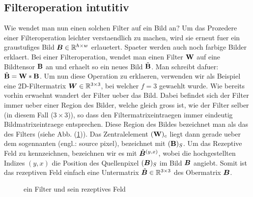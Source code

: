 \subsection{Filteroperation intutitiv}\label{sec:filteroperation_intuitiv}
Wie wendet man nun einen solchen Filter auf ein Bild an? Um das Prozedere einer
Filteroperation leichter verstaendlich zu machen, wird sie erneut fuer ein
graustufiges Bild $\bm{B} \in \mathbb{R}^{h \times w}$ erlauetert. Spaeter werden auch noch farbige
Bilder erklaert.
\para{}
Bei einer Filteroperation, wendet man einen Filter $\mathbf{W}$ auf eine Bildtensor
$\mathbf{B}$ an und erhaelt so ein neues Bild $\tilde{\mathbf{B}}$. Man schreibt dafuer:
$\tilde{\mathbf{B}} = \mathbf{W} * \mathbf{B}$.
\para{}
Um nun diese Operation zu erklaeren, verwenden wir als Beispiel eine
2D-Filtermatrix $\bm{W} \in \mathbb{R}^{3 \times 3}$, bei welcher
$f = 3$ gewaehlt wurde.
Wie bereits vorhin erwaehnt wandert der Filter ueber das Bild. Dabei befindet
sich der Filter immer ueber einer Region des Bilder, welche gleich gross ist,
wie der Filter selber (in diesem Fall ($3 \times 3$)), so dass den Filtermatrixeintraegen immer eindeutig
Bildmatrixeintraege entsprechen. Diese Region des Bildes bezeichnet man als das
 des Filters (siehe Abb. (\ref{fig:receptive_field})).
Das Zentralelement $(\mathbf{W})_c$ liegt dann gerade ueber dem sogennanten
 (engl.: source pixel), bezeichnet mit $(\mathbf{B})_S$.
Um das Rezeptive Feld zu kennzeichnen, bezeichnen wir es mit $\hat{\bm{B}}^{(y,x)}$, wobei die hochgestellten Indizes $(y,x)$ die Position
des Quellenpixel $(\bm{B})_S$ im Bild $\bm{B}$ angiebt. Somit ist das rezeptiven Feld einfach eine
Untermatrix $\tilde{\bm{B}} \in \mathbb{R}^{3 \times 3}$ des Obermatrix $\bm{B}$.

\begin{figure}[h!]

  \caption{ein Filter und sein rezeptives Feld}
  \label{fig:receptive_field}
\end{figure}

